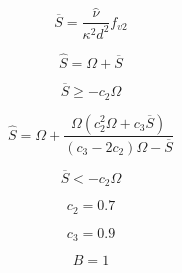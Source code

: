 

\begin{equation}
\overline S = \frac{\hat \nu}{\kappa^2 d^2} f_{v2}
\end{equation}

\begin{equation}
\hat S = \Omega + \overline S
\end{equation}

\begin{equation}
\overline S \ge -c_2 \Omega
\end{equation}

\begin{equation}
\hat S = \Omega + \frac{\Omega ( c_2^2\Omega + c_3 \overline S)}{(c_3 - 2 c_2)\Omega - \overline S}
\end{equation}

\begin{equation}
\overline S < -c_2 \Omega
\end{equation}

\begin{equation}
c_2=0.7
\end{equation}

\begin{equation}
c_3=0.9
\end{equation}

\begin{equation}
B=1
\end{equation}


